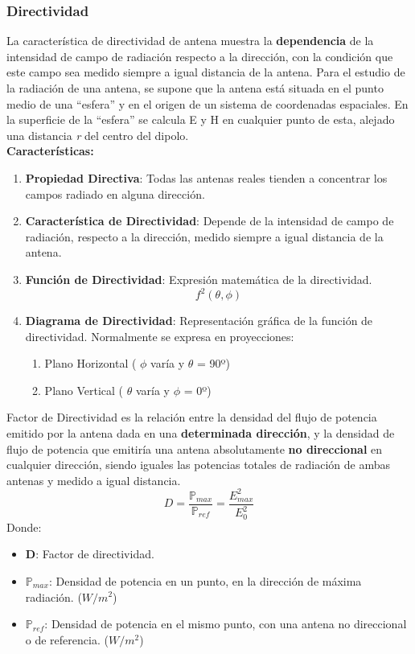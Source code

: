 \documentclass[
	12pt, %
	fleqn, %
	a4paper, %
	oneside, %
]{LegrandOrangeBook}
\begin{document}
\subsubsection{Directividad}
La característica de directividad de antena muestra la \textbf{dependencia} de la intensidad de campo de radiación respecto a la dirección, con la condición que este campo sea medido siempre a igual distancia de la antena. Para el estudio de la radiación de una antena, se supone que la antena está situada en el punto medio de una ``esfera'' y en el origen de un sistema de coordenadas espaciales.
En la superficie de la ``esfera'' se calcula E y H en cualquier punto de esta, alejado una distancia \textit{r} del centro del dipolo.\\
\textbf{Características:}
\begin{enumerate}
\item \textbf{Propiedad Directiva}: Todas las antenas reales tienden a concentrar los campos radiado en alguna dirección.
\item \textbf{Característica de Directividad}: Depende de la intensidad de campo de radiación, respecto a la dirección, medido siempre a igual distancia de la antena. 
\item \textbf{Función de Directividad}: Expresión matemática de la directividad.
\begin{displaymath}
f^2(\theta,\phi)
\end{displaymath}
\item \textbf{Diagrama de Directividad}: Representación gráfica de la función de directividad. Normalmente se expresa en proyecciones:
\begin{enumerate}
\item Plano Horizontal ( $\phi$ varía y $\theta$ = 90º)
\item Plano Vertical ( $\theta$ varía y $\phi$	 = 0º)
\end{enumerate}
\end{enumerate}
\begin{definition}
Factor de Directividad es la relación entre la densidad del flujo de potencia emitido por la antena dada en una \textbf{determinada dirección}, y la densidad de flujo de potencia que emitiría una antena absolutamente \textbf{no direccional} en cualquier dirección, siendo iguales las potencias totales de radiación de ambas antenas y medido a igual distancia.
\begin{equation}
D=\frac{\mathbb{P}_{max}}{\mathbb{P}_{ref}}=\frac{E_{max}^2}{E_0^2}
\label{eq:directividad}
\end{equation}
Donde:
\begin{itemize}
\item \textbf{D}: Factor de directividad.
\item $\mathbb{P}_{max}$: Densidad de potencia en un punto, en la dirección de máxima radiación. ($W/m^2$)
\item $\mathbb{P}_{ref}$: Densidad de potencia en el mismo punto, con una antena no direccional o de referencia. ($W/m^2$)
\end{itemize}
\end{definition}
\end{document}
